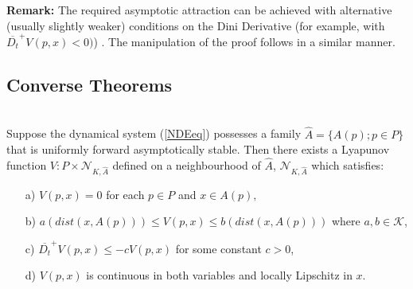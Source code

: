 {\bf Remark:} The required asymptotic attraction can be achieved
with alternative (usually slightly weaker) conditions on the Dini
Derivative (for example, with $\overline{D_t}^+ V(p, x) < 0)$) .
The manipulation of the proof follows in a similar manner.

\subsection{Converse Theorems}

\begin{therm} \hfill \\
\label{confuasthm}
Suppose the dynamical system (\ref{NDEeq}) possesses a family $\hat{A} =
\{A(p) ; p \in P \}$ that is uniformly forward asymptotically stable. Then
there exists a Lyapunov function $V:P \times \mathcal{N}_{K,\hat{A}}$ defined
on a neighbourhood of $\hat{A}$, $\mathcal{N}_{K,\hat{A}}$ which satisfies:
\begin{itemize}
  \item[a)] $V(p, x) = 0$ for each $p \in P$ and $x \in A(p),$
  \item[b)] $a(dist( x, A(p))) \leq V(p, x) \leq b( dist( x, A(p)))$
    where $a, b \in \mathcal{K}$,
  \item[c)] $\overline{D_t}^+ V(p, x) \leq -cV(p, x)$ for some constant $c >
    0$,
  \item[d)] $V(p, x)$ is continuous in both variables and locally Lipschitz in
    $x$.
\end{itemize}
\end{therm}
